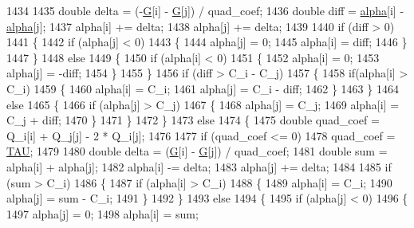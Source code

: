\begin{DoxyCode}
1434 
1435       \textcolor{keywordtype}{double} delta = (-\hyperlink{class_s_v_m289___b_f_s_1_1_solver_a23dd808efd06b7ef3a97c54b0c3c8824}{G}[i] - \hyperlink{class_s_v_m289___b_f_s_1_1_solver_a23dd808efd06b7ef3a97c54b0c3c8824}{G}[j]) / quad\_coef;
1436       \textcolor{keywordtype}{double} diff = \hyperlink{class_s_v_m289___b_f_s_1_1_solver_a8a95f4c9f0b029661c53d858534c0408}{alpha}[i] - \hyperlink{class_s_v_m289___b_f_s_1_1_solver_a8a95f4c9f0b029661c53d858534c0408}{alpha}[j];
1437       alpha[i] += delta;
1438       alpha[j] += delta;
1439       
1440       \textcolor{keywordflow}{if}  (diff > 0)
1441       \{
1442         \textcolor{keywordflow}{if}  (alpha[j] < 0)
1443         \{
1444           alpha[j] = 0;
1445           alpha[i] = diff;
1446         \}
1447       \}
1448       \textcolor{keywordflow}{else}
1449       \{
1450         \textcolor{keywordflow}{if}  (alpha[i] < 0)
1451         \{
1452           alpha[i] = 0;
1453           alpha[j] = -diff;
1454         \}
1455       \}
1456       \textcolor{keywordflow}{if}  (diff > C\_i - C\_j)
1457       \{
1458         \textcolor{keywordflow}{if}(alpha[i] > C\_i)
1459         \{
1460           alpha[i] = C\_i;
1461           alpha[j] = C\_i - diff;
1462         \}
1463       \}
1464       \textcolor{keywordflow}{else}
1465       \{
1466         \textcolor{keywordflow}{if}  (alpha[j] > C\_j)
1467         \{
1468           alpha[j] = C\_j;
1469           alpha[i] = C\_j + diff;
1470         \}
1471       \}
1472     \}
1473     \textcolor{keywordflow}{else}
1474     \{
1475       \textcolor{keywordtype}{double} quad\_coef = Q\_i[i] + Q\_j[j] - 2 * Q\_i[j];
1476 
1477       \textcolor{keywordflow}{if}  (quad\_coef <= 0)
1478         quad\_coef = \hyperlink{svm289___b_f_s_8cpp_a3d8c9c145887af5174ba4cc6789862ad}{TAU};
1479 
1480       \textcolor{keywordtype}{double} delta = (\hyperlink{class_s_v_m289___b_f_s_1_1_solver_a23dd808efd06b7ef3a97c54b0c3c8824}{G}[i] - \hyperlink{class_s_v_m289___b_f_s_1_1_solver_a23dd808efd06b7ef3a97c54b0c3c8824}{G}[j]) / quad\_coef;
1481       \textcolor{keywordtype}{double} sum = alpha[i] + alpha[j];
1482       alpha[i] -= delta;
1483       alpha[j] += delta;
1484 
1485       \textcolor{keywordflow}{if}  (sum > C\_i)
1486       \{
1487         \textcolor{keywordflow}{if}  (alpha[i] > C\_i)
1488         \{
1489           alpha[i] = C\_i;
1490           alpha[j] = sum - C\_i;
1491         \}
1492       \}
1493       \textcolor{keywordflow}{else}
1494       \{
1495         \textcolor{keywordflow}{if}  (alpha[j] < 0)
1496         \{
1497           alpha[j] = 0;
1498           alpha[i] = sum;

\end{DoxyCode}
